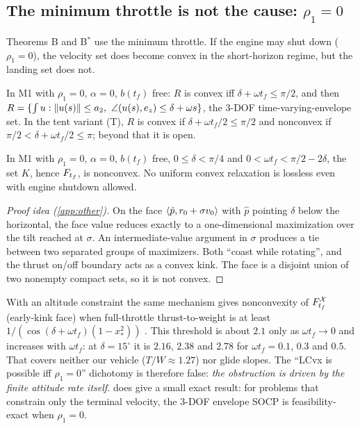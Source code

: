 \subsection{The minimum throttle is not the cause: $\rho_1=0$}\label{sec:rho0}
Theorems B and B$^*$ use the minimum throttle. If the engine may shut down ($\rho_1=0$), the velocity set does become convex
in the short-horizon regime, but the landing set does not.

\begin{proposition}\label{prop:P0R}
In M1 with $\rho_1=0$, $\alpha=0$, $b(t_f)$ free: $R$ is convex iff $\delta+\omega t_f\le\pi/2$, and then
$R=\{\int u:\norm{u(s)}\le a_2,\ \angle(u(s),\ez)\le\delta+\omega s\}$, the 3-DOF time-varying-envelope set. In the tent variant
(T), $R$ is convex if $\delta+\omega t_f/2\le\pi/2$ and nonconvex if $\pi/2<\delta+\omega t_f/2\le\pi$; beyond that it is open.\Srep
\end{proposition}
\begin{theorem}[P0-F: landing set nonconvex with $\rho_1=0$]\label{thm:P0F}
In M1 with $\rho_1=0$, $\alpha=0$, $b(t_f)$ free, $0\le\delta<\pi/4$ and $0<\omega t_f<\pi/2-2\delta$, the set $K$, hence $F_{t_f}$, is
nonconvex. No uniform convex relaxation is lossless even with engine shutdown allowed.\Sproved
\end{theorem}
\begin{proof}[Proof idea (\cref{app:other})]
On the face $\langle \hat p,r_0+\sigma v_0\rangle$ with $\hat p$ pointing $\delta$ below the horizontal, the face value reduces exactly
to a one-dimensional maximization over the tilt reached at $\sigma$. An intermediate-value argument in $\sigma$ produces a tie
between two separated groups of maximizers. Both ``coast while rotating'', and the thrust on/off boundary acts as a
convex kink. The face is a disjoint union of two nonempty compact sets, so it is not convex.
\end{proof}
With an altitude constraint the same mechanism gives nonconvexity of $F^{\mathcal X}_{t_f}$ (early-kink face) when full-throttle
thrust-to-weight is at least $1/(\cos(\delta+\omega t_f)(1-x_*^2))$ . This threshold is about $2.1$ only as
$\omega t_f\to0$ and increases with $\omega t_f$: at $\delta=15^\circ$ it is $2.16$, $2.38$ and $2.78$ for $\omega t_f=0.1$, $0.3$ and $0.5$. That covers neither our
vehicle ($T/W\approx1.27$) nor glide slopes. The ``LCvx is possible iff $\rho_1=0$'' dichotomy is therefore false: \emph{the
obstruction is driven by the finite attitude rate itself.}  does give a small exact result: for problems that
constrain only the terminal velocity, the 3-DOF envelope SOCP is feasibility-exact when $\rho_1=0$.

